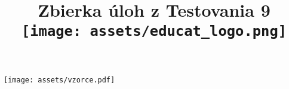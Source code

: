\documentclass[twoside, 12pt]{book}
\title{Zbierka úloh z Testovania 9\\
\texttt{[image: assets/educat\_logo.png]}}
\date{}
\theoremstyle{definition}
\begin{document}
	\maketitle
	\tableofcontents
	
	\texttt{[image: assets/vzorce.pdf]}
	
	
	
	
	
	
	
	
\end{document}
